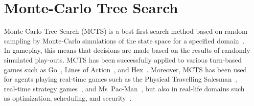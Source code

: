 \documentclass{kecsmstr}
\begin{document}
\section{Monte-Carlo Tree Search}
Monte-Carlo Tree Search (MCTS) is a best-first search method based on random sampling by Monte-Carlo simulations of the state space for a specified domain~. In gameplay, this means that decisions are made based on the results of randomly simulated play-outs. MCTS has been successfully applied to various turn-based games such as Go~, Lines of Action~, and Hex~. Moreover, MCTS has been used for agents playing real-time games such as the Physical Travelling Salesman~, real-time strategy games~, and Ms~Pac-Man~, but also in real-life domains such as optimization, scheduling, and security~.
\end{document}
